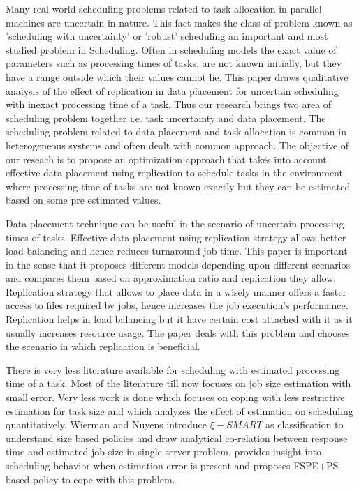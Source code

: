 \documentclass[10pt, conference, compsocconf]{IEEEtran}
\begin{document}
Many real world scheduling problems related to task allocation in parallel machines are uncertain in nature. This fact makes the class of problem  known as 'scheduling with uncertainty' or 'robust' scheduling an important and most studied problem in Scheduling.  Often in  scheduling models the exact value of parameters such as processing times of tasks, are not known initially,   but they have a range outside which their values cannot  lie.  This paper draws qualitative analysis of the effect of replication in data placement for uncertain scheduling with inexact processing time of a task. Thus  our research brings two area of scheduling problem together i.e. task uncertainty and data placement.  The scheduling problem related to data placement and task allocation is common in heterogeneous systems and often dealt with common approach.  The objective of our reseach  is to propose an optimization approach that takes into account  effective data placement using replication to schedule  tasks in the environment where processing time of tasks are not known exactly but they can be estimated based on some pre estimated values.

Data placement technique can be useful in the scenario of uncertain processing times of tasks. Effective data placement using replication strategy allows better load balancing and hence reduces turnaround job time.   This paper is important in the sense that it proposes different models depending upon different scenarios and compares them based on approximation ratio and replication they allow.  Replication strategy that allows to place data in a wisely manner  offers a faster access to files required by  jobs, hence increases the job execution’s performance. Replication helps in load balancing but it have certain cost attached with it as it usually increases resource usage\cite{IEEEhowto:wang}.  The paper deals with this problem and chooses the scenario in which replication is beneficial. 


There is very less literature available for scheduling with estimated processing time of a task.  Most of the literature till now focuses on job size estimation with small error.  Very less work is done which focuses on coping with less restrictive estimation for task size and which analyzes the effect of estimation on scheduling quantitatively.   Wierman and Nuyens \cite{IEEEhowto:Wierman} introduce $ \xi-SMART$ as classification to understand size based policies and draw analytical co-relation between response time and estimated job size in single server problem. \cite{IEEEhowto:Matteo} provides insight into scheduling behavior when estimation error is present and proposes FSPE+PS based policy to cope with this problem.
 
\end{document}
